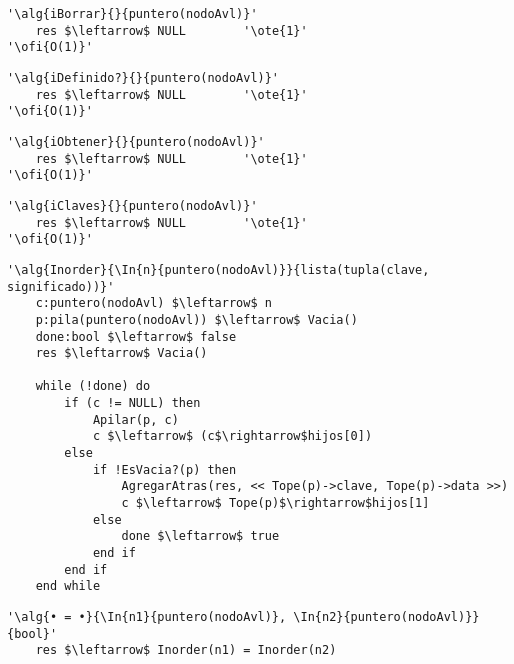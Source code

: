 \begin{lstlisting}[mathescape]
'\alg{iBorrar}{}{puntero(nodoAvl)}'
	res $\leftarrow$ NULL		 '\ote{1}'
'\ofi{O(1)}'
\end{lstlisting}

\begin{lstlisting}[mathescape]
'\alg{iDefinido?}{}{puntero(nodoAvl)}'
	res $\leftarrow$ NULL		 '\ote{1}'
'\ofi{O(1)}'
\end{lstlisting}

\begin{lstlisting}[mathescape]
'\alg{iObtener}{}{puntero(nodoAvl)}'
	res $\leftarrow$ NULL		 '\ote{1}'
'\ofi{O(1)}'
\end{lstlisting}

\begin{lstlisting}[mathescape]
'\alg{iClaves}{}{puntero(nodoAvl)}'
	res $\leftarrow$ NULL		 '\ote{1}'
'\ofi{O(1)}'
\end{lstlisting}


\begin{lstlisting}[mathescape]
'\alg{Inorder}{\In{n}{puntero(nodoAvl)}}{lista(tupla(clave, significado))}'
	c:puntero(nodoAvl) $\leftarrow$ n
	p:pila(puntero(nodoAvl)) $\leftarrow$ Vacia()
	done:bool $\leftarrow$ false
	res $\leftarrow$ Vacia()

	while (!done) do
		if (c != NULL) then
			Apilar(p, c)
			c $\leftarrow$ (c$\rightarrow$hijos[0])
		else
			if !EsVacia?(p) then
				AgregarAtras(res, << Tope(p)->clave, Tope(p)->data >>)
				c $\leftarrow$ Tope(p)$\rightarrow$hijos[1]
			else
				done $\leftarrow$ true
			end if
		end if
	end while
\end{lstlisting}

\begin{lstlisting}[mathescape]
'\alg{• = •}{\In{n1}{puntero(nodoAvl)}, \In{n2}{puntero(nodoAvl)}}{bool}'
	res $\leftarrow$ Inorder(n1) = Inorder(n2)
\end{lstlisting}
